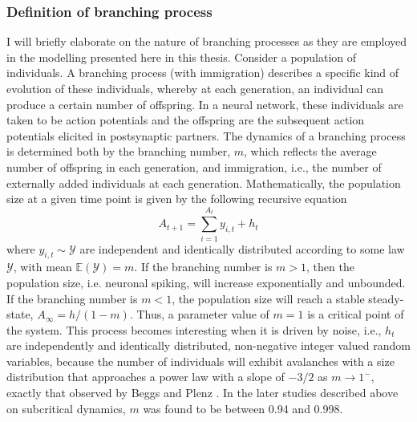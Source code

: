 \subsubsection{Definition of branching process} \label{sec:branching_prcoess}
I will briefly elaborate on the nature of branching processes as they are employed in the modelling presented here in this thesis. Consider a population of individuals. A branching process (with immigration) describes a specific kind of evolution of these individuals, whereby at each generation, an individual can produce a certain number of offspring. In a neural network, these individuals are taken to be action potentials and the offspring are the subsequent action potentials elicited in postsynaptic partners. The dynamics of a branching process is determined both by the branching number, $m$, which reflects the average number of offspring in each generation, and immigration, i.e., the number of externally added individuals at each generation. Mathematically, the population size at a given time point is given by the following recursive equation \cite{Wilting2018}
\begin{equation}
    A_{t+1} = \sum_{i=1}^{A_{t}} y_{i,t} + h_t
\end{equation}
where $y_{i,t}\sim\mathcal{Y}$ are independent and identically distributed according to some law $\mathcal{Y}$, with mean $\mathbb{E}(\mathcal{Y})=m$. If the branching number is $m>1$, then the population size, i.e. neuronal spiking, will increase exponentially and unbounded. If the branching number is $m<1$, the population size will reach a stable steady-state, $A_{\infty}=h/(1-m)$. Thus, a parameter value of $m=1$ is a critical point of the system. This process becomes interesting when it is driven by noise, i.e., $h_t$ are independently and identically distributed, non-negative integer valued random variables, because the number of individuals will exhibit avalanches with a size distribution that approaches a power law with a slope of $-3/2$ as $m\to1^-$, exactly that observed by Beggs and Plenz \cite{Beggs2003}. In the later studies described above on subcritical dynamics, $m$ was found to be between 0.94 and 0.998.

